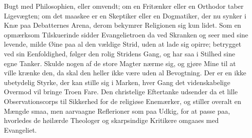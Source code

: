 \documentclass[12pt,a4paper]{book}
\begin{document}
Bugt med Philosophien, eller omvendt; om en Fritænker eller en Orthodor taber
Ligevægten; om det maaskee er en Skeptiker eller en Dogmatiker, der nu synker i Knæ paa
Debatternes Arena, derom bekymrer Religionen sig kun lidet. Som en opmærksom
Tilskuerinde sidder Evangelietroen da ved Skranken og seer med sine levende, milde Øine
paa al den vældige Strid, uden at lade sig opirre; betrygget ved sin Eenfoldighed,
følger den rolig Stridens Gang, og har saa i Stilhed sine egne Tanker. Skulde nogen af
de store Magter nærme sig, og gjøre Mine til at ville krænke den, da skal den heller
ikke være uden al Bevogtning. Der er en ikke ubetydelig Styrke, der kan stille sig i
Marken, hver Gang det videnskabelige Overmod vil bringe Troen Fare. Den christelige
Eftertanke udsender da et lille Observationscorps til Sikkerhed for de religiøse
Enemærker, og stiller overalt en Mængde
smaa, men aarvaagne Reflerioner som paa Udkig, for at passe paa, hvorledes de høilærde
Theologer og skarpsindige Kritikere omgaaes med Evangeliet.
\end{document}
